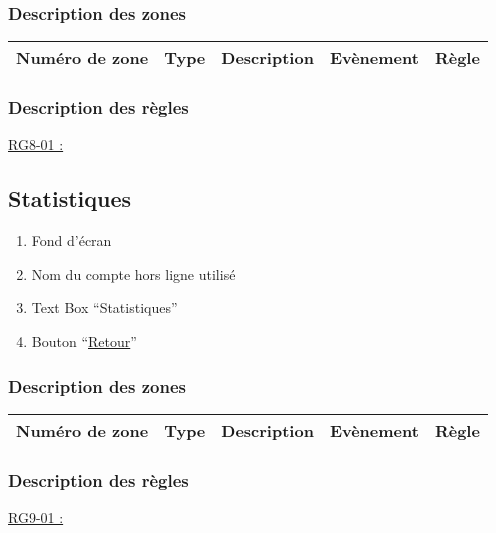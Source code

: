 \documentclass{report}
\begin{document}
		\subsubsection{Description des zones}
		
			\begin{tabular}{|c|c|c|c|c|} \hline
				Numéro de zone & Type  & Description & Evènement &	Règle \\\hline
			\end{tabular}
			
		\subsubsection{Description des règles}

			\underline{RG8-01 :}
				\begin{quote}
				
				\end{quote}
	
\newpage

	\subsection{Statistiques}
	
		
		
		\hypertarget{Statistiques}{}
		\label{Statistiques}
		
		\begin{enumerate}
		  \item Fond d'écran
		  \item Nom du compte hors ligne utilisé
		  \item Text Box ``Statistiques''
		  \item Bouton ``\hyperlink{Accueil}{Retour}''
		\end{enumerate}

		\subsubsection{Description des zones}
		
			\begin{tabular}{|c|c|c|c|c|} \hline
				Numéro de zone & Type  & Description & Evènement &	Règle \\\hline
			\end{tabular}
			
		\subsubsection{Description des règles}

			\underline{RG9-01 :}
				\begin{quote}
				
				\end{quote}
	
\newpage
	
\end{document}
